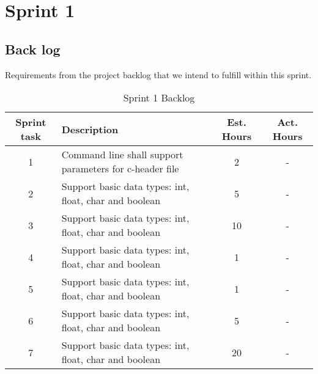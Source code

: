 \chapter{Sprint 1}

\section{Back log}
Requirements from the project backlog that we intend to fulfill within this sprint.

\begin{table}[ht] \center
\caption{Sprint 1 Backlog}
\begin{tabular}{c p{6cm} c  c}
	Sprint task & Description & Est. Hours & Act. Hours \\
	\hline
	1 & Command line shall support parameters for c-header file & 2 & -\\
	2 & Support basic data types: int, float, char and boolean & 5 & -\\	
	3 & Support basic data types: int, float, char and boolean & 10 & -\\
	4 & Support basic data types: int, float, char and boolean & 1 & -\\
	5 & Support basic data types: int, float, char and boolean & 1 & -\\	
	6 & Support basic data types: int, float, char and boolean & 5 & -\\
	7 & Support basic data types: int, float, char and boolean & 20 & -\\
\end{tabular}
\end{table}

